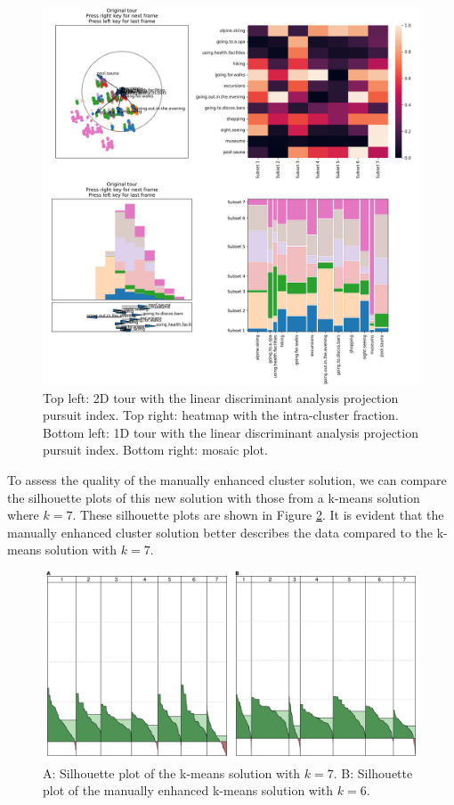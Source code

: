 \documentclass[article]{ajs}
\begin{document}
\begin{figure}[h!]
    \centering
    \includegraphics[width=1\textwidth]{winter_cl7_post.png}
    \caption{Top left: 2D tour with the linear discriminant analysis projection pursuit index. Top right: heatmap with the intra-cluster fraction. Bottom left: 1D tour with the linear discriminant analysis projection pursuit index. Bottom right: mosaic plot.}
    \label{fig:winter_cl7_post}
\end{figure}

To assess the quality of the manually enhanced cluster solution, we can compare the silhouette plots of this new solution with those from a k-means solution where \(k = 7\). These silhouette plots are shown in Figure \ref{fig:silhouette_comparison_k7_man}. It is evident that the manually enhanced cluster solution better describes the data compared to the k-means solution with \(k = 7\).

\begin{figure}[h!]
    \centering
    \includegraphics[width=1\textwidth]{silhouette_comparison_k7_man.png}
    \caption{A: Silhouette plot of the k-means solution with \(k=7\). B: Silhouette plot of the manually enhanced k-means solution with \(k=6\).}
    \label{fig:silhouette_comparison_k7_man}
\end{figure}
\end{document}
